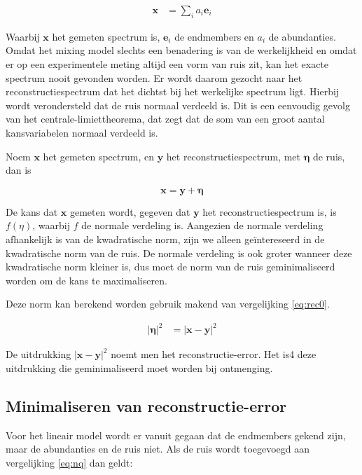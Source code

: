 \documentclass[12pt]{report}
\begin{document}


\begin{align}
\bm{x} &= \sum_i a_i \bm{e}_i \label{eq:nq}
\end{align}

Waarbij $\bm{x}$ het gemeten spectrum is, $\bm{e}_i$ de endmembers en $a_i$ de abundanties. Omdat het mixing model slechts een benadering is van de werkelijkheid en omdat er op een experimentele meting altijd een vorm van ruis zit, kan het exacte spectrum nooit gevonden worden. Er wordt daarom gezocht naar het reconstructiespectrum dat het dichtst bij het werkelijke spectrum ligt. Hierbij wordt verondersteld dat de ruis normaal verdeeld is. Dit is een eenvoudig gevolg van het centrale-limiettheorema, dat zegt dat de som van een groot aantal kansvariabelen normaal verdeeld is. 

Noem $\bm{x}$ het gemeten spectrum, en $\bm{y}$ het reconstructiespectrum, met $\bm{\eta}$ de ruis, dan is

\begin{equation}\label{eq:rec0}
\bm{x} = \bm{y} + \bm{\eta}
\end{equation}

De kans dat $\bm{x}$ gemeten wordt, gegeven dat $\bm{y}$ het reconstructiespectrum is, is $f(\eta)$, waarbij $f$ de normale verdeling is. Aangezien de normale verdeling afhankelijk is van de kwadratische norm, zijn we alleen ge\"intereseerd in de kwadratische norm van de ruis. De normale verdeling is ook groter wanneer deze kwadratische norm kleiner is, dus moet de norm van de ruis geminimaliseerd worden om de kans te maximaliseren.  

Deze norm kan berekend worden gebruik makend van vergelijking \ref{eq:rec0}.

\begin{eqnarray}
\left|\bm{\eta}\right|^2 &= \left|\bm{x} - \bm{y}\right|^2 \label{eq:rec}
\end{eqnarray}

De uitdrukking $\left|\bm{x} - \bm{y}\right|^2$ noemt men het reconstructie-error. Het is4 deze uitdrukking die geminimaliseerd moet worden bij ontmenging. 


\subsection{Minimaliseren van reconstructie-error}
Voor het lineair model wordt er vanuit gegaan dat de endmembers gekend zijn, maar de abundanties en de ruis niet. Als de ruis wordt toegevoegd aan vergelijking \ref{eq:nq} dan geldt:
\end{document}
